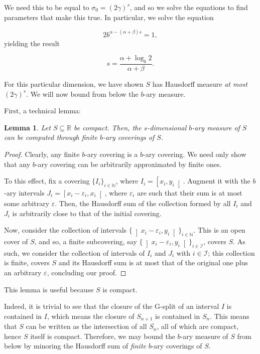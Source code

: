 \documentclass[11pt, reqno]{amsart}
\newcommand{\R}{\mathbb{R}}
\newcommand{\N}{\mathbb{N}}
\newtheorem{lemma}{Lemma}
\begin{document}
We need this to be equal to $\sigma_0 = (2 \gamma)^s$, and so we solve the equations to find parameters that make this true. In particular, we solve the equation

\[ 2 b^{\alpha - (\alpha + \beta) s} = 1,\]
yielding the result

\[s = \frac{\alpha + \log_b 2}{\alpha + \beta}.\]

For this particular dimension, we have shown $S$ has Hausdorff measure \emph{at most} $(2 \gamma)^s$. We will now bound from below the $b$-ary measure.

First, a technical lemma:

\begin{lemma}
Let $S \subseteq \R$ be compact. Then, the $s$-dimensional $b$-ary measure of $S$ can be computed through finite $b$-ary coverings of $S$.
\end{lemma}

\begin{proof}
Clearly, any finite $b$-ary covering is a $b$-ary covering. We need only show that any $b$-ary covering can be arbitrarily approximated by finite ones.

To this effect, fix a covering $\{ I_i \}_{i \in \N}$, where $I_i = \left[x_i, y_i \right[$. Augment it with the $b$-ary intervals $J_i = \left[x_i - \varepsilon_i, x_i \right[$, where $\varepsilon_i$ are such that their sum is at most some arbitrary $\varepsilon$. Then, the Hausdorff sum of the collection formed by all $I_i$ and $J_i$ is arbitrarily close to that of the initial covering.

Now, consider the collection of intervals $\{ \left]x_i - \varepsilon_i, y_i \right[ \}_{i \in \N}$. This is an open cover of $S$, and so, a finite subcovering, say $\{ \left]x_i - \varepsilon_i, y_i \right[ \}_{i \in \mathcal{I}}$, covers $S$. As such, we consider the collection of intervals of $I_i$ and $J_i$ with $i \in \mathcal{I}$; this collection is finite, covers $S$ and its Hausdorff sum is at most that of the original one plus an arbitrary $\varepsilon$, concluding our proof.
\end{proof}

This lemma is useful because $S$ is compact.

Indeed, it is trivial to see that the closure of the G-split of an interval $I$ is contained in $I$, which means the closure of $S_{n+1}$ is contained in $S_n$. This means that $S$ can be written as the intersection of all $\overline{S_n}$, all of which are compact, hence $S$ itself is compact. Therefore, we may bound the $b$-ary measure of $S$ from below by minoring the Hausdorff sum of \emph{finite} $b$-ary coverings of $S$.
\end{document}

